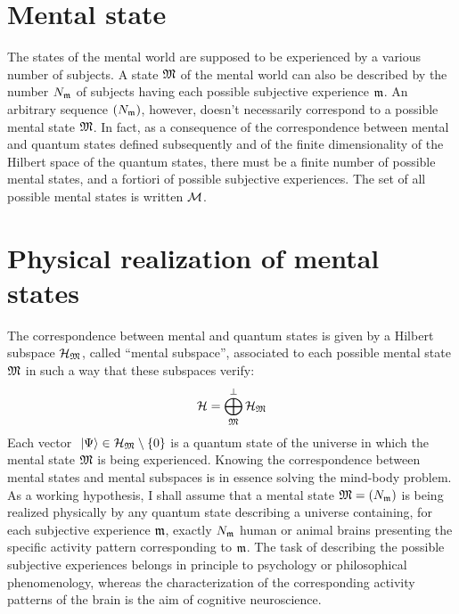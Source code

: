\section{Mental state}

The states of the mental world are supposed to be experienced by a various number of subjects.
A state $\mathfrak{M}$ of the mental world can also be described by the number ${N}_{\mathfrak{m}}$ of subjects having each possible subjective experience $\mathfrak{m}$.
An arbitrary sequence $({N}_{\mathfrak{m}})$, however, doesn't necessarily correspond to a possible mental state $\mathfrak{M}$.
In fact, as a consequence of the correspondence between mental and quantum states defined subsequently and of the finite dimensionality of the Hilbert space of the quantum states, there must be a finite number of possible mental states, and a fortiori of possible subjective experiences.
The set of all possible mental states is written $\mathcal M$.

\section{Physical realization of mental states}

The correspondence between mental and quantum states is given by a Hilbert subspace $\mathcal H_{\mathfrak{M}}$, called ``mental subspace'', associated to each possible mental state $\mathfrak{M}$ in such a way that these subspaces verify:
\begin{equation*}
\mathcal H = \bigoplus_{\mathfrak{M}}^\perp \mathcal H_{\mathfrak{M}}
\end{equation*}
Each vector $\ \left|{\Psi}\right\rangle \in \mathcal H_{\mathfrak{M}} \setminus \{0\}$ is a quantum state of the universe in which the mental state $\mathfrak{M}$ is being experienced.
Knowing the correspondence between mental states and mental subspaces is in essence solving the mind-body problem.
As a working hypothesis, I shall assume that a mental state $\mathfrak{M} = ({N}_{\mathfrak{m}})$ is being realized physically by any quantum state describing a universe containing, for each subjective experience $\mathfrak{m}$, exactly ${N}_{\mathfrak{m}}$ human or animal brains presenting the specific activity pattern corresponding to $\mathfrak{m}$.
The task of describing the possible subjective experiences belongs in principle to psychology or philosophical phenomenology, whereas the characterization of the corresponding activity patterns of the brain is the aim of cognitive neuroscience.

